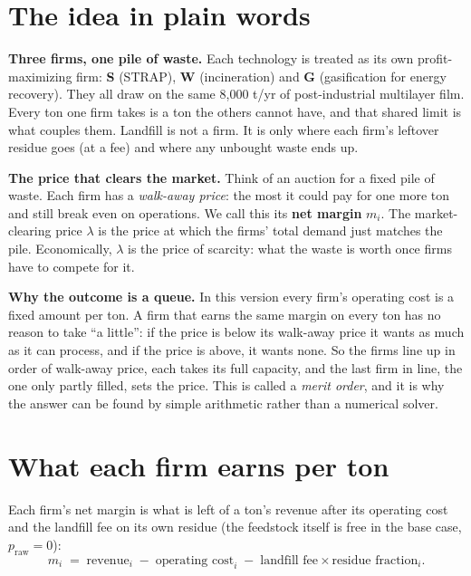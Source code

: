 \documentclass[11pt]{article}
\begin{document}
\section{The idea in plain words}

\textbf{Three firms, one pile of waste.} Each technology is treated as its own
profit-maximizing firm: \textbf{S} (STRAP), \textbf{W} (incineration) and
\textbf{G} (gasification for energy recovery). They all draw on the same
8{,}000 t/yr of post-industrial multilayer film. Every ton one firm takes is a
ton the others cannot have, and that shared limit is what couples them.
Landfill is not a firm. It is only where each firm's leftover residue goes (at a
fee) and where any unbought waste ends up.

\textbf{The price that clears the market.} Think of an auction for a fixed pile
of waste. Each firm has a \emph{walk-away price}: the most it could pay for one
more ton and still break even on operations. We call this its
\textbf{net margin} $m_i$. The market-clearing price $\lambda$ is the price at
which the firms' total demand just matches the pile. Economically, $\lambda$ is
the price of scarcity: what the waste is worth once firms have to compete for it.

\textbf{Why the outcome is a queue.} In this version every firm's operating cost
is a fixed amount per ton. A firm that earns the same margin on every ton has no
reason to take ``a little'': if the price is below its walk-away price it wants
as much as it can process, and if the price is above, it wants none. So the
firms line up in order of walk-away price, each takes its full capacity, and the
last firm in line, the one only partly filled, sets the price. This is called a
\emph{merit order}, and it is why the answer can be found by simple arithmetic
rather than a numerical solver.

\section{What each firm earns per ton}

Each firm's net margin is what is left of a ton's revenue after its operating
cost and the landfill fee on its own residue (the feedstock itself is free in
the base case, $p_{\mathrm{raw}}=0$):
\[
m_i \;=\; \text{revenue}_i \;-\; \text{operating cost}_i \;-\; \text{landfill fee}\times\text{residue fraction}_i .
\]
\end{document}

